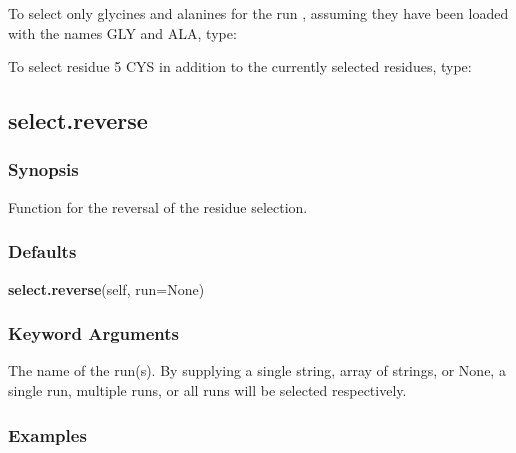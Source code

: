  To select only glycines and alanines for the run , assuming they have been loaded with the names GLY and ALA, type: 
  



 To select residue 5 CYS in addition to the currently selected residues, type: 
  






  

 \newpage 

 \subsection{select.reverse} 

  
 \subsubsection{Synopsis} 

 Function for the reversal of the residue selection. 
  

  
 \subsubsection{Defaults} 

 \textsf{\textbf{select.reverse}(self, run=None)} 

  
 \subsubsection{Keyword Arguments} 

   The name of the run(s).  By supplying a single string, array of strings, or None, a single run, multiple runs, or all runs will be selected respectively.  

  

  
 \subsubsection{Examples} 

